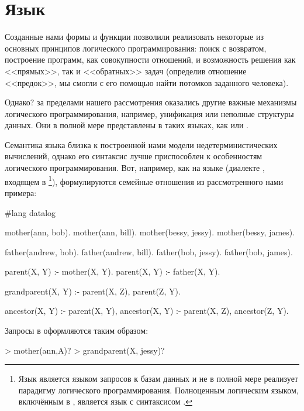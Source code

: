 \section[2]{Язык }%
Созданные нами формы и функции позволили реализовать некоторые из основных принципов логического программирования: поиск с возвратом, построение программ, как совокупности отношений, и возможность решения как <<прямых>>, так и <<обратных>> задач (определив отношение <<предок>>, мы смогли с его помощью найти потомков заданного человека). 

Однако? за пределами нашего рассмотрения оказались другие важные механизмы логического программирования, например, унификация или неполные структуры данных. Они в полной мере представлены в таких языках, как  или .


Семантика языка  близка к построенной нами модели недетерминистических вычислений, однако его синтаксис лучше приспособлен к особенностям логического программирования. Вот, например, как на языке  (диалекте , входящем в \footnote{Язык  является языком запросов к базам данных и не в полной мере реализует парадигму логического программирования. Полноценным логическим языком, включённым в , является язык  с синтаксисом .}), формулируются семейные отношения из рассмотренного нами примера:

\newpage
\begin{Definition}
  #lang datalog

  mother(ann, bob).
  mother(ann, bill).
  mother(bessy, jessy).
  mother(bessy, james).

  father(andrew, bob).
  father(andrew, bill).
  father(bob, jessy).
  father(bob, james).

  parent(X, Y) :- mother(X, Y).
  parent(X, Y) :- father(X, Y).

  grandparent(X, Y) :- parent(X, Z), parent(Z, Y).

  ancestor(X, Y) :- parent(X, Y),
  ancestor(X, Y) :- parent(X, Z), ancestor(Z, Y).
\end{Definition}

Запросы в  оформляются таким образом:

\begin{SchemeCode}
  > mother(ann,A)?
  > grandparent(X, jessy)?
\end{SchemeCode}


